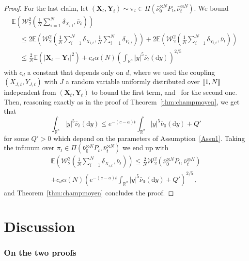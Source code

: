 \documentclass[AHL,Unicode,longabstracts,published]{cedram}
\newcommand{\llbracket}{\mathopen{[\mkern -2.7mu[}}
\newcommand{\rrbracket}{\mathclose{]\mkern -2.7mu]}}
\newcommand{\R}{\mathbb R}
\newcommand{\bbE}{\mathbb E}
\newcommand{\clW}{\mathcal W}
\newcommand{\dd}{\mathrm{d}}
\newcommand{\1}{\mathbbm{1}}
\newcommand{\bX}{\mathbf{X}}
\newcommand{\bY}{\mathbf{Y}}
\newcommand{\R}{\mathbb R}
\newcommand{\clW}{\mathcal W}
\begin{document}
\begin{proof}
For the last claim, let $(\bX_t,\bY_t)\sim \pi_t\in \Pi(\bar\nu_0^{\otimes N} P_t,\bar \nu_t^{\otimes N})$. We bound
\begin{multline*}
\bbE \left( \clW_2^2 \left( \frac1N \sum_{i=1}^N \delta_{X_{i,t}}, \bar\nu_t\right) \right)\\
\begin{aligned}
& \leqslant 2 \bbE \left( \clW_2^2 \left( \frac1N \sum_{i=1}^N \delta_{X_{i,t}}, \frac1N \sum_{i=1}^N \delta_{Y_{i,t}} \right)\right) + 2 \bbE \left( \clW_2^2 \left( \frac1N \sum_{i=1}^N \delta_{Y_{i,t}}, \bar\nu_t\right) \right)\\
& \leqslant \frac{2}N \bbE\left( |\bX_t-\bY_t|^2\right) + c_d \alpha(N)\left(\int_{\R^d} |y|^5 \bar \nu_t(\dd y)\right)^{2/5}
\end{aligned}
\end{multline*}
with $c_d$ a constant that depends only on $d$, where we used the coupling $(X_{J,t},Y_{J,t})$ with $J$ a random variable uniformly distributed over $\llbracket 1,N\rrbracket$ independent from $(\bX_t,\bY_t)$ to bound the first term, and~\cite[Theorem~1]{FournierGuillin} for the second one. Then, reasoning exactly as in the proof of Theorem~\ref{thm:champmoyen}, we get that
\[
\int_{\R^d} |y|^5 \bar \nu_t(\dd y) \leqslant e^{-(c-a)t}\int_{\R^d} |y|^5 \bar \nu_0(\dd y) + Q'
\]
for some $Q'>0$ which depend on the parameters of Assumption~\ref{Assu1}. Taking the infimum over $\pi_t\in \Pi\left(\bar\nu_0^{\otimes N} P_t,\bar \nu_t^{\otimes N}\right)$ we end up with
\begin{multline*}
\bbE \left( \clW_2^2 \left( \frac1N \sum_{i=1}^N \delta_{X_{i,t}}, \bar\nu_t\right) \right)
\leqslant \frac{2}N \clW_2^2\left( \bar\nu_0^{\otimes N} P_t,\bar \nu_t^{\otimes N}\right) \\ + c_d \alpha(N)\left( e^{-(c-a)t}\int_{\R^d} |y|^5 \bar \nu_0(\dd y) + Q'\right)^{2/5}\,,
\end{multline*}
and Theorem~\ref{thm:champmoyen} concludes the proof.
\end{proof}


\section{Discussion}\label{sec:discussion}
\label{Sec:reflexionProof}



\subsubsection*{On the two proofs}
\end{document}
